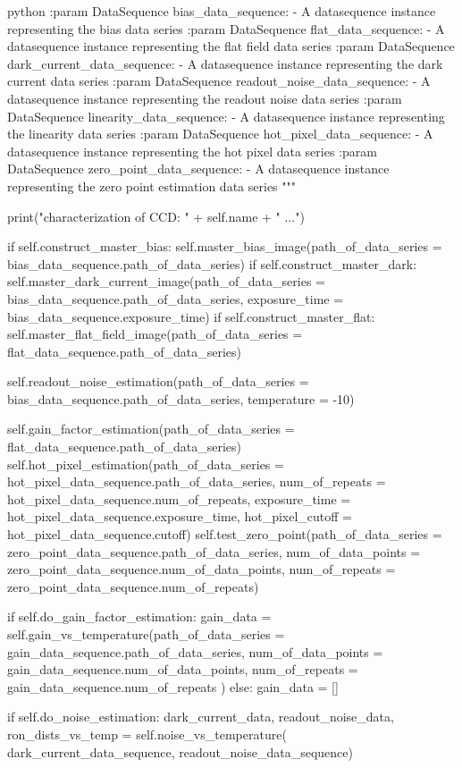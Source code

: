 \documentclass[../main.tex]{subfiles}
\begin{document}
\begin{mintedbox}{python}
:param DataSequence bias_data_sequence:
- A datasequence instance representing the bias data series
:param DataSequence flat_data_sequence:
- A datasequence instance representing the flat field data series
:param DataSequence dark_current_data_sequence:
- A datasequence instance representing the dark current data series
:param DataSequence readout_noise_data_sequence:
- A datasequence instance representing the readout noise data series
:param DataSequence linearity_data_sequence:
- A datasequence instance representing the linearity data series
:param DataSequence hot_pixel_data_sequence:
- A datasequence instance representing the hot pixel data series
:param DataSequence zero_point_data_sequence:
- A datasequence instance representing the zero point estimation data series
"""

print("\nInitializing characterization of CCD: " + self.name + " ...")

if self.construct_master_bias:
self.master_bias_image(path_of_data_series = bias_data_sequence.path_of_data_series)
if self.construct_master_dark:
self.master_dark_current_image(path_of_data_series = bias_data_sequence.path_of_data_series,
exposure_time = bias_data_sequence.exposure_time)
if self.construct_master_flat:
self.master_flat_field_image(path_of_data_series = flat_data_sequence.path_of_data_series)

self.readout_noise_estimation(path_of_data_series = bias_data_sequence.path_of_data_series,
temperature = -10)

self.gain_factor_estimation(path_of_data_series = flat_data_sequence.path_of_data_series)
self.hot_pixel_estimation(path_of_data_series = hot_pixel_data_sequence.path_of_data_series,
num_of_repeats = hot_pixel_data_sequence.num_of_repeats,
exposure_time = hot_pixel_data_sequence.exposure_time,
hot_pixel_cutoff = hot_pixel_data_sequence.cutoff)
self.test_zero_point(path_of_data_series = zero_point_data_sequence.path_of_data_series,
num_of_data_points = zero_point_data_sequence.num_of_data_points,
num_of_repeats = zero_point_data_sequence.num_of_repeats)

if self.do_gain_factor_estimation:
gain_data  =  self.gain_vs_temperature(path_of_data_series = gain_data_sequence.path_of_data_series,
num_of_data_points = gain_data_sequence.num_of_data_points,
num_of_repeats = gain_data_sequence.num_of_repeats
)
else:
gain_data  =  []

if self.do_noise_estimation:
dark_current_data, readout_noise_data, ron_dists_vs_temp  =  self.noise_vs_temperature(
dark_current_data_sequence, readout_noise_data_sequence)


\end{mintedbox}
\end{document}
